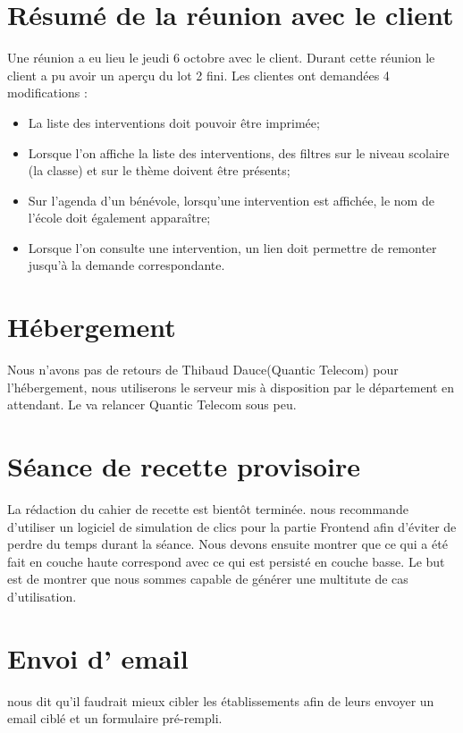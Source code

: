 \documentclass [a4paper] {article}
\begin{document}
\section{Résumé de la réunion avec le client}
Une réunion a eu lieu le jeudi 6 octobre avec le client. Durant cette réunion le client a pu avoir un aperçu du lot 2 fini. Les clientes ont demandées 4 modifications : 
\begin{itemize}
	\item	La liste des interventions doit pouvoir être imprimée;
	\item	Lorsque l'on affiche la liste des interventions, des filtres sur le niveau scolaire (la classe) et sur le thème doivent être présents;
	\item	Sur l'agenda d'un bénévole, lorsqu'une intervention est affichée, le nom de l'école doit également apparaître;
	\item	Lorsque l'on consulte une intervention, un lien doit permettre de remonter jusqu'à la demande correspondante.
\end{itemize} 


\section{Hébergement}
Nous n'avons pas de retours de Thibaud Dauce(Quantic Telecom) pour l'hébergement, nous utiliserons le serveur mis à disposition par le département en attendant. Le \CP{} va relancer Quantic Telecom sous peu.

\section{Séance de recette provisoire}
La rédaction du cahier de recette est bientôt terminée. \nomTuteurPedago{} nous recommande d'utiliser un logiciel de simulation de clics pour la partie Frontend afin d'éviter de perdre du temps durant la séance. Nous devons ensuite montrer que ce qui a été fait en couche haute correspond avec ce qui est persisté en couche basse. Le but est de montrer que nous sommes capable de générer une multitute de cas d'utilisation.

\section{Envoi d' email}
\nomTuteurPedago{} nous dit qu'il faudrait mieux cibler les établissements afin de leurs envoyer un email ciblé et un formulaire pré-rempli.
\newpage
\end{document}
